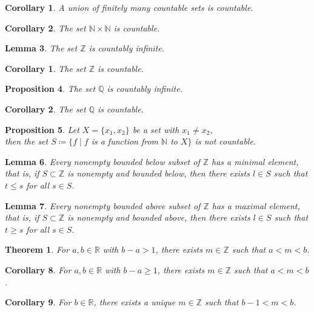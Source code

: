 \documentclass[11pt]{article}
\theoremstyle{break}
\theoremstyle{break}
\newtheorem{thm}{Theorem}[section]
\newtheorem{lem}{Lemma}[thm]
\newtheorem{prop}[lem]{Proposition}
\newtheorem{corL}{Corollary}[lem]
\newtheorem{corT}[lem]{Corollary}
\newcommand{\R}{\mathbb{R}}
\newcommand{\N}{\mathbb{N}}
\newcommand{\Z}{\mathbb{Z}}
\newcommand{\Q}{\mathbb{Q}}
\begin{document}
	\begin{corT}
		A union of finitely many countable sets is countable.
	\end{corT} 
	
	\begin{corT}
		The set $\N \times \N$ is countable.
	\end{corT}
	
	\begin{lem}
		The set $\Z$ is countably infinite.
	\end{lem}
	
	\begin{corL}
		The set $\Z$ is countable.
	\end{corL}
	
	\begin{prop}
		The set $\Q$ is countably infinite.
	\end{prop}
		
	\begin{corL}
		The set $\Q$ is countable.
	\end{corL}
	
	\begin{prop}
		Let $X=\{x_1,x_2\}$ be a set with $x_1 \neq x_2$,\\ then the set $S \coloneqq \{f \mid f$ is a function from $\N$ to $X \} $ is not countable.
	\end{prop}
	
	\begin{lem}
		Every nonempty bounded below subset of $\Z$ has a minimal element, that is, if $S \subset \Z$ is nonempty and bounded below, then there exists $l \in S$ such that $t \leq s$ for all $s \in S$.
	\end{lem}	
	
	\begin{lem}
		Every nonempty bounded above subset of $\Z$ has a maximal element, that is, if $S \subset \Z$ is nonempty and bounded above, then there exists $l \in S$ such that $t \geq s$ for all $s \in S$.
	\end{lem}
	
	\begin{thm}
		For $a,b \in \R$ with $b-a>1$, there exists $m \in \Z$ such that $a<m<b$.
	\end{thm}
	
	\begin{corT}
		For $a,b \in \R$ with $b-a \geq 1$, there exists $m \in \Z$ such that $a<m<b$.
	\end{corT}
	
	\begin{corT}
		For $b \in \R$, there exists a unique $m \in \Z$ such that $b-1<m<b$.
	\end{corT}
	
\end{document}
